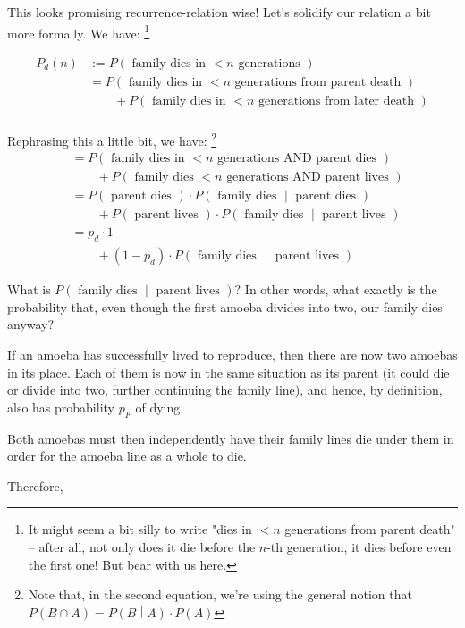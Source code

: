 This looks promising recurrence-relation wise! Let's solidify our relation a bit more formally. We have: \footnote{It might seem a bit silly to write "dies in $<n$ generations from parent death" -- after all, not only does it die before the $n$-th generation, it dies before even the first one! But bear with us here.}

\begin{align*}
P_d(n) &:= P(\text{ family dies in $< n$ generations }) \\
&= P(\text{ family dies in $< n$ generations from parent death }) \\
&\qquad + P(\text{ family dies in $< n$ generations from later death }) \\ %
\end{align*}


Rephrasing this a little bit, we have: \footnote{Note that, in the second equation, we're using the general notion that $P(B \cap A) = P\left(B \middle| A\right) \cdot P(A)$}
\begin{align*}
&= P(\text{ family dies in $< n$ generations AND parent dies }) \\
&\qquad + P(\text{ family dies $< n$ generations AND parent lives }) \\
&= P(\text{ parent dies }) \cdot P\left(\text{ family dies } \middle| \text{ parent dies }\right) \\
&\qquad + P(\text{ parent lives }) \cdot P\left(\text{ family dies } \middle| \text{ parent lives }\right) \\
&= p_d \cdot 1 \\
&\qquad + (1 - p_d) \cdot P\left(\text{ family dies } \middle| \text{ parent lives }\right)
\end{align*}

What is $P\left(\text{ family dies } \middle| \text{ parent lives }\right)$? In other words, what exactly is the probability that, even though the first amoeba divides into two, our family dies anyway?

If an amoeba has successfully lived to reproduce, then there are now two amoebas in its place. Each of them is now in the same situation as its parent (it could die or divide into two, further continuing the family line), and hence, by definition, also has probability $p_F$ of dying. 

Both amoebas must then independently have their family lines die under them in order for the amoeba line as a whole to die.

Therefore, 

